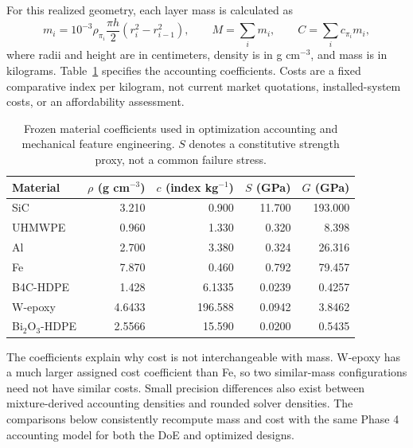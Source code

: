 For this realized geometry, each layer mass is calculated as
\begin{equation}
m_i=10^{-3}\rho_{\pi_i}\frac{\pi h}{2}(r_i^2-r_{i-1}^2),\qquad
M=\sum_i m_i,\qquad C=\sum_i c_{\pi_i}m_i,\label{eq:mass}
\end{equation}
where radii and height are in centimeters, density is in g cm$^{-3}$, and mass is in kilograms. Table~\ref{tab:materials} specifies the accounting coefficients. Costs are a fixed comparative index per kilogram, not current market quotations, installed-system costs, or an affordability assessment.
\begin{table}[htbp]\centering\small
\caption{Frozen material coefficients used in optimization accounting and mechanical feature engineering. $S$ denotes a constitutive strength proxy, not a common failure stress.}\label{tab:materials}
\begin{tabular}{@{}lrrrr@{}}\toprule
Material & $\rho$ (g cm$^{-3}$) & $c$ (index kg$^{-1}$) & $S$ (GPa) & $G$ (GPa)\\\midrule
SiC &3.210&0.900&11.700&193.000\\
UHMWPE &0.960&1.330&0.320&8.398\\
Al &2.700&3.380&0.324&26.316\\
Fe &7.870&0.460&0.792&79.457\\
B4C-HDPE &1.428&6.1335&0.0239&0.4257\\
W-epoxy &4.6433&196.588&0.0942&3.8462\\
Bi$_2$O$_3$-HDPE &2.5566&15.590&0.0200&0.5435\\\bottomrule
\end{tabular}\end{table}
The coefficients explain why cost is not interchangeable with mass. W-epoxy has a much larger assigned cost coefficient than Fe, so two similar-mass configurations need not have similar costs. Small precision differences also exist between mixture-derived accounting densities and rounded solver densities. The comparisons below consistently recompute mass and cost with the same Phase 4 accounting model for both the DoE and optimized designs.

